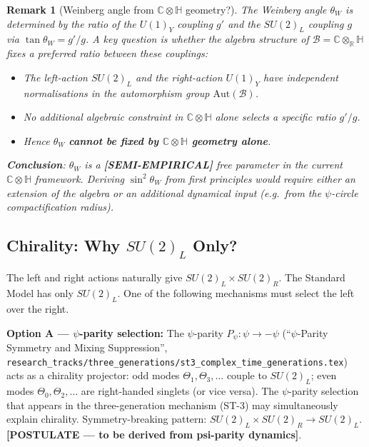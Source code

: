 \documentclass[12pt]{article}
\newtheorem{remark}[definition]{Remark}
\newcommand{\C}{\mathbb{C}}
\newcommand{\R}{\mathbb{R}}
\renewcommand{\H}{\mathbb{H}}
\newcommand{\Aut}{\mathrm{Aut}}
\begin{document}
\begin{remark}[Weinberg angle from $\C\otimes\H$ geometry?]
\label{rem:weinberg}
The Weinberg angle $\theta_W$ is determined by the ratio of the $U(1)_Y$ coupling
$g'$ and the $SU(2)_L$ coupling $g$ via $\tan\theta_W = g'/g$.
A key question is whether the algebra structure of $\mathcal{B} = \C\otimes_\R\H$ fixes
a preferred ratio between these couplings:
\begin{itemize}
  \item The left-action $SU(2)_L$ and the right-action $U(1)_Y$ have \emph{independent}
    normalisations in the automorphism group $\Aut(\mathcal{B})$.
  \item No additional algebraic constraint in $\C\otimes\H$ alone selects a specific
    ratio $g'/g$.
  \item Hence $\theta_W$ \textbf{cannot be fixed by $\C\otimes\H$ geometry alone}.
\end{itemize}
\textbf{Conclusion}: $\theta_W$ is a \textbf{[SEMI-EMPIRICAL]} free parameter in
the current $\C\otimes\H$ framework.  Deriving $\sin^2\theta_W$ from first principles
would require either an extension of the algebra or an additional dynamical input
(e.g.\ from the $\psi$-circle compactification radius).
\end{remark}

\subsection{Chirality: Why $SU(2)_L$ Only?}
\label{subsec:chirality}

The left and right actions naturally give $SU(2)_L \times SU(2)_R$.
The Standard Model has only $SU(2)_L$.  One of the following mechanisms
must select the left over the right.

\textbf{Option A --- $\psi$-parity selection:}
The $\psi$-parity $P_\psi : \psi \to -\psi$ (``$\psi$-Parity Symmetry and Mixing Suppression'',
\texttt{research\_tracks/three\_generations/st3\_complex\_time\_generations.tex})
acts as a chirality projector:
odd modes $\Theta_1, \Theta_3, \ldots$ couple to $SU(2)_L$;
even modes $\Theta_0, \Theta_2, \ldots$ are right-handed singlets (or vice versa).
The $\psi$-parity selection that appears in the three-generation mechanism
(ST-3) may simultaneously explain chirality.
Symmetry-breaking pattern: $SU(2)_L \times SU(2)_R \to SU(2)_L$.
\textbf{[POSTULATE --- to be derived from psi-parity dynamics]}.
\end{document}
